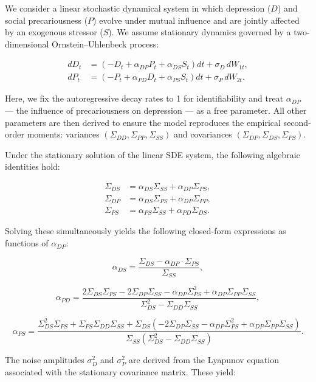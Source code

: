 \documentclass[
]{article}
\begin{document}
We consider a linear stochastic dynamical system in which depression
(\(D\)) and social precariousness (\(P\)) evolve under mutual influence
and are jointly affected by an exogenous stressor (\(S\)). We assume
stationary dynamics governed by a two-dimensional Ornstein--Uhlenbeck
process:

\[
\begin{aligned}
dD_t &= \left(-D_t + \alpha_{DP} P_t + \alpha_{DS} S_t\right)dt + \sigma_D\, dW_{1t}, \\
dP_t &= \left(-P_t + \alpha_{PD} D_t + \alpha_{PS} S_t\right)dt + \sigma_P\, dW_{2t}.
\end{aligned}
\]

Here, we fix the autoregressive decay rates to 1 for identifiability and
treat \(\alpha_{DP}\) --- the influence of precariousness on depression
--- as a free parameter. All other parameters are then derived to ensure
the model reproduces the empirical second-order moments: variances
\((\Sigma_{DD}, \Sigma_{PP}, \Sigma_{SS})\) and covariances
\((\Sigma_{DP}, \Sigma_{DS}, \Sigma_{PS})\).

Under the stationary solution of the linear SDE system, the following
algebraic identities hold:

\[
\begin{aligned}
\Sigma_{DS} &= \alpha_{DS} \Sigma_{SS} + \alpha_{DP} \Sigma_{PS}, \\
\Sigma_{DP} &= \alpha_{DS} \Sigma_{PS} + \alpha_{DP} \Sigma_{PP}, \\
\Sigma_{PS} &= \alpha_{PS} \Sigma_{SS} + \alpha_{PD} \Sigma_{DS}.
\end{aligned}
\]

Solving these simultaneously yields the following closed-form
expressions as functions of \(\alpha_{DP}\):

\[
\alpha_{DS} = \frac{\Sigma_{DS} - \alpha_{DP} \cdot \Sigma_{PS}}{\Sigma_{SS}},
\]

\[
\alpha_{PD} = \frac{2 \Sigma_{DS} \Sigma_{PS} - 2 \Sigma_{DP} \Sigma_{SS} - \alpha_{DP} \Sigma_{PS}^2 + \alpha_{DP} \Sigma_{PP} \Sigma_{SS}}{\Sigma_{DS}^2 - \Sigma_{DD} \Sigma_{SS}},
\]

\[
\alpha_{PS} = \frac{
\Sigma_{DS}^2 \Sigma_{PS}
+ \Sigma_{PS} \Sigma_{DD} \Sigma_{SS}
+ \Sigma_{DS}(-2 \Sigma_{DP} \Sigma_{SS} - \alpha_{DP} \Sigma_{PS}^2 + \alpha_{DP} \Sigma_{PP} \Sigma_{SS})
}{
\Sigma_{SS}(\Sigma_{DS}^2 - \Sigma_{DD} \Sigma_{SS})
}.
\]

The noise amplitudes \(\sigma_D^2\) and \(\sigma_P^2\) are derived from
the Lyapunov equation associated with the stationary covariance matrix.
These yield:
\end{document}
